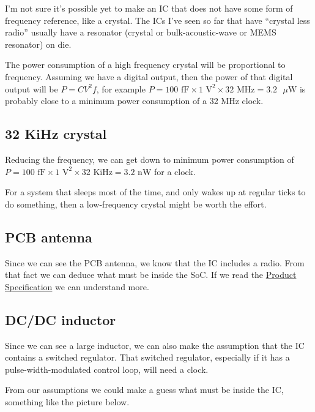 I'm not sure it's possible yet to make an IC that does not have some
form of frequency reference, like a crystal. The ICs I've seen so far
that have ``crystal less radio'' usually have a resonator (crystal or
bulk-acoustic-wave or MEMS resonator) on die.

The power consumption of a high frequency crystal will be proportional
to frequency. Assuming we have a digital output, then the power of that
digital output will be \(P = C V^2 f\), for example
\(P = 100\text{ fF} \times 1\text{ V}^2 \times 32\text{ MHz} = 3.2\text{ } \mu\text{W}\)
is probably close to a minimum power consumption of a 32 MHz clock.

\subsection{32 KiHz crystal}\label{kihz-crystal}

Reducing the frequency, we can get down to minimum power consumption of
\(P = 100\text{ fF} \times 1\text{ V}^2 \times 32\text{ KiHz} = 3.2 \text{ nW}\)
for a clock.

For a system that sleeps most of the time, and only wakes up at regular
ticks to do something, then a low-frequency crystal might be worth the
effort.

\subsection{PCB antenna}\label{pcb-antenna}

Since we can see the PCB antenna, we know that the IC includes a radio.
From that fact we can deduce what must be inside the SoC. If we read the
\href{https://infocenter.nordicsemi.com/index.jsp?topic=\%2Fstruct_nrf52\%2Fstruct\%2Fnrf52832_ps.html}{Product
Specification} we can understand more.

\subsection{DC/DC inductor}\label{dcdc-inductor}

Since we can see a large inductor, we can also make the assumption that
the IC contains a switched regulator. That switched regulator,
especially if it has a pulse-width-modulated control loop, will need a
clock.

From our assumptions we could make a guess what must be inside the IC,
something like the picture below.

